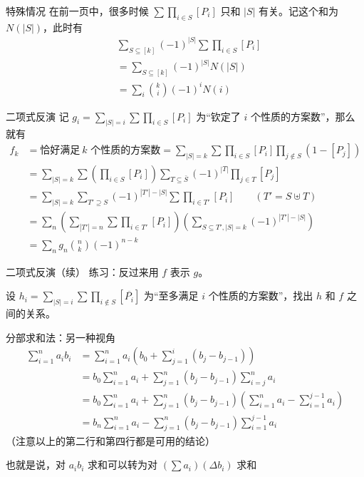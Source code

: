 \begin{frame}{特殊情况}
    在前一页中，很多时候 $\sum\prod_{i\in S}[P_i]$ 只和 $|S|$ 有关。记这个和为 $N(|S|)$，此时有
    $$
    \begin{aligned}
    &\sum_{S\subseteq [k]} (-1)^{|S|}\sum \prod_{i\in S}[P_i]\\
    &=\sum_{S\subseteq [k]}(-1)^{|S|}N(|S|)\\
    &=\sum_i\binom{k}{i}(-1)^i N(i)
    \end{aligned}
    $$
\end{frame}
\begin{frame}{二项式反演}
    记 $g_i=\sum_{|S|=i}\sum\prod_{i\in S}[P_i]$ 为“钦定了 $i$ 个性质的方案数”，那么就有
    $$
    \begin{aligned}
    f_k&=\text{恰好满足}\ k\text{ 个性质的方案数}=\sum_{|S|=k}\sum \prod_{i\in S}[P_i]\prod_{j\notin S}(1-[P_j])\\
    &=\sum_{|S|=k}\sum\left(\prod_{i\in S}[P_i]\right)\sum_{T\subseteq \bar S}(-1)^{|T|}\prod_{j\in T}[P_j]\\
    &=\sum_{|S|=k}\sum_{T'\supseteq S}(-1)^{|T'|-|S|}\sum\prod_{i\in T'}[P_i]\qquad(T'=S\uplus T)\\
    &=\sum_{n}\left(\sum_{|T'|=n}\sum\prod_{i\in T'}[P_i]\right)\left(\sum_{S\subseteq T',|S|=k}(-1)^{|T'|-|S|}\right)\\
    &=\sum_n g_n\binom{n}{k}(-1)^{n-k}
    \end{aligned}
    $$
\end{frame}
\begin{frame}{二项式反演（续）}
    练习：反过来用 $f$ 表示 $g$。
    
    设 $h_i=\sum_{|S|=i}\sum\prod_{i\notin S}[\overline{P_i}]$ 为“至多满足 $i$ 个性质的方案数”，找出 $h$ 和 $f$ 之间的关系。
\end{frame}
\begin{frame}{分部求和法：另一种视角}
    $$
    \begin{aligned}
    \sum_{i=1}^na_ib_i&=\sum_{i=1}^na_i\left(b_0+\sum_{j=1}^i(b_j-b_{j-1})\right)\\
    &=b_0\sum_{i=1}^na_i+\sum_{j=1}^n(b_j-b_{j-1})\sum_{i=j}^n a_i\\
    &=b_0\sum_{i=1}^na_i+\sum_{j=1}^n(b_j-b_{j-1})\left(\sum_{i=1}^na_i-\sum_{i=1}^{j-1}a_i\right)\\
    &=b_n\sum_{i=1}^na_i-\sum_{j=1}^n(b_j-b_{j-1})\sum_{i=1}^{j-1}a_i
    \end{aligned}
    $$
    （注意以上的第二行和第四行都是可用的结论）

    也就是说，对 $a_ib_i$ 求和可以转为对 $(\sum a_i)(\Delta b_i)$ 求和
\end{frame}
